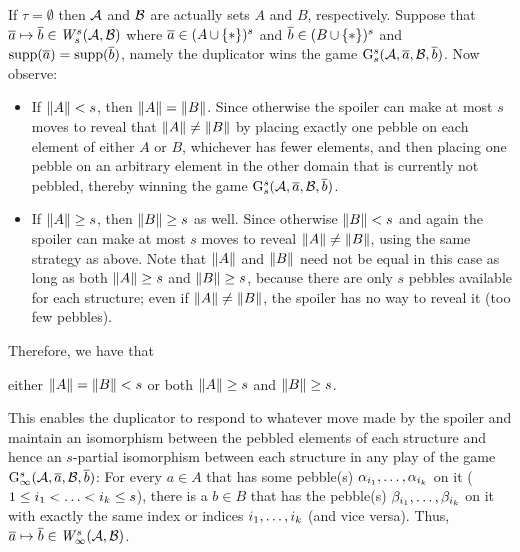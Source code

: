 \begin{enumerate}[1.]
If $\tau = \emptyset$ then $\mathcal{A}$ and $\mathcal{B}$ are actually sets $A$ and $B$, respectively. Suppose that $\vect{a} \mapsto \vect{b} \in \winpos[s]{s}(\strct{A}, \strct{B})$ where $\overline{a} \in (A \mathop{\cup} {\{\ast\}})^{s}$ and $\overline{b} \in (B \mathop{\cup} {\{\ast\}})^{s}$ and $\mathrm{supp}(\overline{a}) = \mathrm{supp}(\overline{b})$, namely the duplicator wins the game $\game[s]{s}(\strct{A}, \vect{a}, \strct{B}, \vect{b})$. Now observe:
\begin{itemize}
\item If $\|A\| < s$, then $\|A\| = \|B\|$. Since otherwise the spoiler can make at most $s$ moves to reveal that $\|A\| \neq \|B\|$ by placing exactly one pebble on each element of either $A$ or $B$, whichever has fewer elements, and then placing one pebble on an arbitrary element in the other domain that is currently not pebbled, thereby winning the game $\game[s]{s}(\strct{A}, \vect{a}, \strct{B}, \vect{b})$.
\item If $\|A\| \geq s$, then $\|B\| \geq s$ as well. Since otherwise $\|B\| < s$ and again the spoiler can make at most $s$ moves to reveal $\|A\| \neq \|B\|$, using the same strategy as above. Note that $\|A\|$ and $\|B\|$ need not be equal in this case as long as both $\|A\| \geq s$ and $\|B\| \geq s$, because there are only $s$ pebbles available for each structure; even if $\|A\| \neq \|B\|$, the spoiler has no way to reveal it (too few pebbles).
\end{itemize}
Therefore, we have that
\begin{center}
either $\|A\| = \|B\| < s$ or both $\|A\| \geq s$ and $\|B\| \geq s$.
\end{center}
This enables the duplicator to respond to whatever move made by the spoiler and maintain an isomorphism between the pebbled elements of each structure and hence an $s$-partial isomorphism between each structure in any play of the game $\game[s]{\infty}(\strct{A}, \vect{a}, \strct{B}, \vect{b})$: For every $a \in A$ that has some pebble(s) $\alpha_{i_1}, \ldots, \alpha_{i_k}$ on it ($1 \leq i_1 < \ldots < i_k \leq s$), there is a $b \in B$ that has the pebble(s) $\beta_{i_1}, \ldots, \beta_{i_k}$ on it with exactly the same index or indices $i_1, \ldots, i_k$ (and vice versa). Thus, $\vect{a} \mapsto \vect{b} \in \winpos[s]{\infty}(\strct{A}, \strct{B})$.


\end{enumerate}
